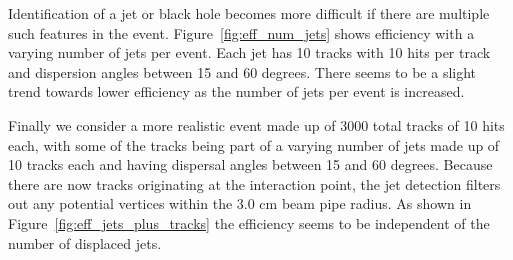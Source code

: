 \documentclass{JINST}
\begin{document}
Identification of a jet or black hole becomes more difficult if there are multiple such features in the event.  Figure~\ref{fig:eff_num_jets} shows efficiency with a varying number of jets per event.  Each jet has 10 tracks with 10 hits per track and dispersion angles between 15 and 60 degrees.  There seems to be a slight trend towards lower efficiency as the number of jets per event is increased.

Finally we consider a more realistic event made up of 3000 total tracks of 10 hits each, with some of the tracks being part of a varying number of jets made up of 10 tracks each and having dispersal angles between 15 and 60 degrees.  Because there are now tracks originating at the interaction point, the jet detection filters out any potential vertices within the 3.0 cm beam pipe radius.  As shown in Figure~\ref{fig:eff_jets_plus_tracks} the efficiency seems to be independent of the number of displaced jets.
%
\end{document}
